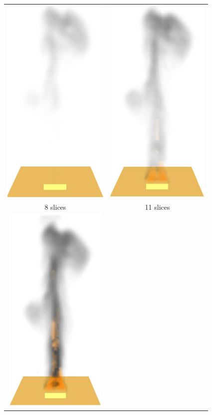 {\begin{figure}[\figoptions]
\begin{center}
\begin{tabular}{cc}
\includegraphics[height=4.0in]{FIGURES/splume_20_27}&
\includegraphics[height=4.0in]{FIGURES/splume_17_27}\\
8 slices&11 slices\\
\includegraphics[height=4.0in]{FIGURES/splume_14_27}&

\end{tabular}
\end{center}
\end{figure}}
